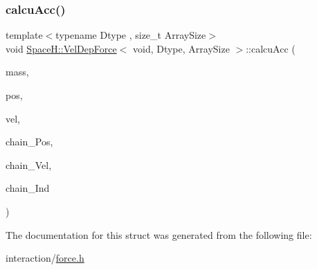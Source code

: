 \mbox{\label{struct_space_h_1_1_vel_dep_force_3_01void_00_01_dtype_00_01_array_size_01_4_a31ca17ff8f9683793b0d0d0438b5298d}} 
\subsubsection{\texorpdfstring{calcu\+Acc()}{calcuAcc()}\hspace{0.1cm}{\footnotesize\ttfamily [2/2]}}
{\footnotesize\ttfamily template$<$typename Dtype , size\+\_\+t Array\+Size$>$ \\
void \mbox{\hyperlink{struct_space_h_1_1_vel_dep_force}{Space\+H\+::\+Vel\+Dep\+Force}}$<$ void, Dtype, Array\+Size $>$\+::calcu\+Acc (\begin{DoxyParamCaption}\item[{const \mbox{\hyperlink{struct_space_h_1_1_vel_dep_force_3_01void_00_01_dtype_00_01_array_size_01_4_a3fdf665781fcc58227d1451b910aca63}{Scalar\+Array}} \&}]{mass,  }\item[{const \mbox{\hyperlink{struct_space_h_1_1_vel_dep_force_3_01void_00_01_dtype_00_01_array_size_01_4_ab9ab08040353afbaeeade8a442331b8d}{Vector\+Array}} \&}]{pos,  }\item[{const \mbox{\hyperlink{struct_space_h_1_1_vel_dep_force_3_01void_00_01_dtype_00_01_array_size_01_4_ab9ab08040353afbaeeade8a442331b8d}{Vector\+Array}} \&}]{vel,  }\item[{const \mbox{\hyperlink{struct_space_h_1_1_vel_dep_force_3_01void_00_01_dtype_00_01_array_size_01_4_ab9ab08040353afbaeeade8a442331b8d}{Vector\+Array}} \&}]{chain_\+Pos,  }\item[{const \mbox{\hyperlink{struct_space_h_1_1_vel_dep_force_3_01void_00_01_dtype_00_01_array_size_01_4_ab9ab08040353afbaeeade8a442331b8d}{Vector\+Array}} \&}]{chain_\+Vel,  }\item[{const \mbox{\hyperlink{struct_space_h_1_1_vel_dep_force_3_01void_00_01_dtype_00_01_array_size_01_4_a58bb8d2f9a35c3d16ed717ea3e13427d}{Index\+Array}} \&}]{chain_\+Ind }\end{DoxyParamCaption})\hspace{0.3cm}{\ttfamily [inline]}}



The documentation for this struct was generated from the following file\+:\begin{DoxyCompactItemize}
\item 
interaction/\mbox{\hyperlink{force_8h}{force.\+h}}\end{DoxyCompactItemize}
